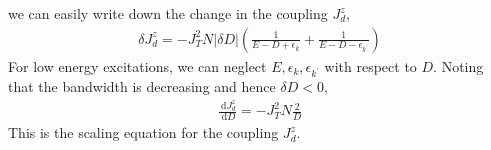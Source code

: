 we can easily write down the change in the coupling \(J_d^z\),
\begin{equation}\begin{aligned}
	\delta J_d^z = -J_T^2 N|\delta D|\left(\frac{1}{E - D + \epsilon_k} + \frac{1}{E - D - \epsilon_{k^\prime}}\right)
\end{aligned}\end{equation}
For low energy excitations, we can neglect \(E, \epsilon_k, \epsilon_{k^\prime}\) with respect to \(D\).
Noting that the bandwidth is decreasing and hence \(\delta D < 0\),
\begin{equation}\begin{aligned}
	\frac{\:\mathrm{d}J_d^z}{\:\mathrm{d}D}=-J_T^2N \frac{2}{D}
\end{aligned}\end{equation}
This is the scaling equation for the coupling \(J_d^z\).

